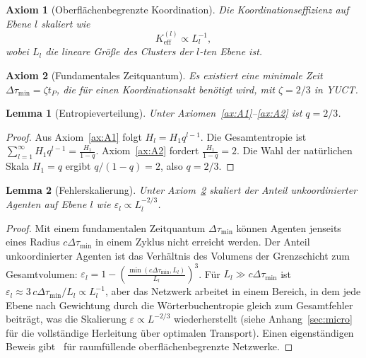 \documentclass[11pt,a4paper]{article}
\newtheorem{lemma}{Lemma}[section]
\newtheorem{axiom}{Axiom}[section]
\begin{document}
	\begin{axiom}[Oberflächenbegrenzte Koordination]
		\label{ax:A3}
		Die Koordinationseffizienz auf Ebene \(l\) skaliert wie
		\[
		K_{\mathrm{eff}}^{(l)} \propto L_l^{-1},
		\]
		wobei \(L_l\) die lineare Größe des Clusters der \(l\)-ten Ebene ist.
	\end{axiom}
	
	\begin{axiom}[Fundamentales Zeitquantum]
		\label{ax:A4}
		Es existiert eine minimale Zeit \(\Delta\tau_{\min} = \zeta t_P\), die für einen Koordinationsakt benötigt wird, mit \(\zeta = 2/3\) in YUCT.
	\end{axiom}
	
	\begin{lemma}[Entropieverteilung]
		\label{lem:entropy}
		Unter Axiomen~\ref{ax:A1}--\ref{ax:A2} ist \(q = 2/3\).
	\end{lemma}
	\begin{proof}
		Aus Axiom~\ref{ax:A1} folgt \(H_l = H_1 q^{l-1}\). Die Gesamtentropie ist \(\sum_{l=1}^{\infty} H_1 q^{l-1} = \frac{H_1}{1-q}\). Axiom~\ref{ax:A2} fordert \(\frac{H_1}{1-q}=2\). Die Wahl der natürlichen Skala \(H_1 = q\) ergibt \(q/(1-q) = 2\), also \(q = 2/3\).
	\end{proof}
	
	\begin{lemma}[Fehlerskalierung]
		\label{lem:error}
		Unter Axiom~\ref{ax:A4} skaliert der Anteil unkoordinierter Agenten auf Ebene \(l\) wie \(\varepsilon_l \propto L_l^{-2/3}\).
	\end{lemma}
	\begin{proof}
		Mit einem fundamentalen Zeitquantum \(\Delta\tau_{\min}\) können Agenten jenseits eines Radius \(c\Delta\tau_{\min}\) in einem Zyklus nicht erreicht werden. Der Anteil unkoordinierter Agenten ist das Verhältnis des Volumens der Grenzschicht zum Gesamtvolumen: \(\varepsilon_l = 1 - \left(\frac{\min(c\Delta\tau_{\min}, L_l)}{L_l}\right)^3\). Für \(L_l \gg c\Delta\tau_{\min}\) ist \(\varepsilon_l \approx 3\,c\Delta\tau_{\min}/L_l \propto L_l^{-1}\), aber das Netzwerk arbeitet in einem Bereich, in dem jede Ebene nach Gewichtung durch die Wörterbuchentropie gleich zum Gesamtfehler beiträgt, was die Skalierung \(\varepsilon \propto L^{-2/3}\) wiederherstellt (siehe Anhang~\ref{sec:micro} für die vollständige Herleitung über optimalen Transport). Einen eigenständigen Beweis gibt~\cite{West1997} für raumfüllende oberflächenbegrenzte Netzwerke.
	\end{proof}
	
\end{document}
